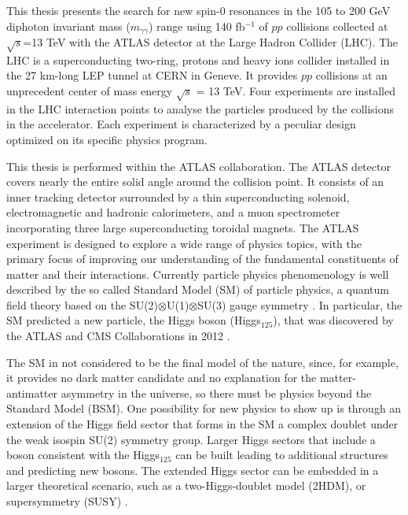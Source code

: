\documentclass[a4paper, oneside, 11pt]{book}
\begin{document}
	This thesis presents the search for new spin-0 resonances in the 105 to 200 GeV diphoton invariant mass ($m_{\gamma\gamma}$) range using 140 fb$^{-1}$ of $pp$ collisions collected at $\sqrt{s}$=13 TeV with the ATLAS detector at the Large Hadron Collider (LHC). The LHC \cite{LHC_DESIGN_2004,LHC_DESIGN_2008} is a superconducting two-ring, protons and heavy ions collider installed in the 27 km-long LEP \cite{LEP_DESIGN_2001} tunnel at CERN in Geneve. It provides $pp$ collisions at an unprecedent center of mass energy $\sqrt{s}$ = 13 TeV. Four experiments are installed in the LHC interaction points to analyse the particles produced by the collisions in the accelerator. Each experiment is characterized by a peculiar design optimized on its specific physics program.
	
	This thesis is performed within the ATLAS \cite{ATLAS_DESIGN_2008} collaboration. The ATLAS detector covers nearly the entire solid angle around the collision point. It consists of an inner tracking detector surrounded by a thin superconducting solenoid, electromagnetic and hadronic calorimeters, and a muon spectrometer incorporating three large superconducting toroidal magnets. The ATLAS experiment is designed to explore a wide range of physics topics, with the primary focus of improving our understanding of the fundamental constituents of matter and their interactions. Currently particle physics phenomenology is well described by the so called Standard Model (SM) of particle physics, a quantum field theory based on the SU(2)$\otimes$U(1)$\otimes$SU(3) gauge symmetry \cite{weinberg_1995}. In particular, the SM predicted a new particle, the Higgs boson (Higgs$_{125}$), that was discovered by the ATLAS and CMS Collaborations in 2012 \cite{higgs_atlas,higgs_cms}.
	
	The SM in not considered to be the final model of the nature, since, for example, it provides no dark matter candidate and no explanation for the matter-antimatter asymmetry in the universe, so there must be physics beyond the Standard Model (BSM). One possibility for new physics to show up is through an extension of the Higgs field sector that forms in the SM a complex doublet under the weak isospin SU(2) symmetry group. Larger Higgs sectors that include a boson consistent with the Higgs$_{125}$ can be built leading to additional structures and predicting new bosons. The extended Higgs sector can be embedded in a larger theoretical scenario, such as a two-Higgs-doublet model (2HDM)\cite{Branco_2012}, or supersymmetry (SUSY) \cite{dine_2016}.
	
\end{document}
